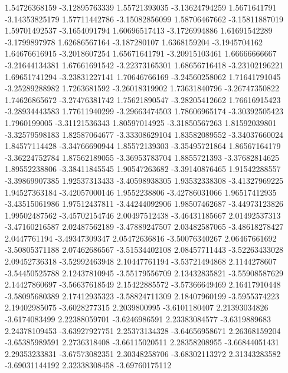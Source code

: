   1.54726368159   -3.12895763339
  1.55721393035   -3.13624794259
   1.5671641791   -3.14353825179
  1.57711442786   -3.15082856099
  1.58706467662   -3.15811887019
  1.59701492537    -3.1654091794
  1.60696517413    -3.1726994886
  1.61691542289    -3.1799897978
  1.62686567164     -3.187280107
   1.6368159204    -3.1945704162
  1.64676616915    -3.2018607254
  1.65671641791   -3.20915103461
  1.66666666667   -3.21644134381
  1.67661691542   -3.22373165301
  1.68656716418   -3.23102196221
  1.69651741294   -3.23831227141
  1.70646766169   -3.24560258062
  1.71641791045   -3.25289288982
   1.7263681592   -3.26018319902
  1.73631840796   -3.26747350822
  1.74626865672   -3.27476381742
  1.75621890547   -3.28205412662
  1.76616915423   -3.28934443583
  1.77611940299   -3.29663474503
  1.78606965174   -3.30392505423
   1.7960199005   -3.31121536343
  1.80597014925   -3.31850567263
  1.81592039801   -3.32579598183
  1.82587064677   -3.33308629104
  1.83582089552   -3.34037660024
  1.84577114428   -3.34766690944
  1.85572139303   -3.35495721864
  1.86567164179   -3.36224752784
  1.87562189055   -3.36953783704
   1.8855721393   -3.37682814625
  1.89552238806   -3.38411845545
  1.90547263682   -3.39140876465
  1.91542288557   -3.39869907385
  1.92537313433   -3.40598938305
  1.93532338308   -3.41327969225
  1.94527363184   -3.42057000146
   1.9552238806   -3.42786031066
  1.96517412935   -3.43515061986
  1.97512437811   -3.44244092906
  1.98507462687   -3.44973123826
  1.99502487562   -3.45702154746
  2.00497512438   -3.46431185667
  2.01492537313   -3.47160216587
  2.02487562189   -3.47889247507
  2.03482587065   -3.48618278427
   2.0447761194   -3.49347309347
  2.05472636816   -3.50076340267
  2.06467661692   -3.50805371188
  2.07462686567   -3.51534402108
  2.08457711443   -3.52263433028
  2.09452736318   -3.52992463948
  2.10447761194   -3.53721494868
   2.1144278607   -3.54450525788
  2.12437810945   -3.55179556709
  2.13432835821   -3.55908587629
  2.14427860697   -3.56637618549
  2.15422885572   -3.57366649469
  2.16417910448   -3.58095680389
  2.17412935323   -3.58824711309
  2.18407960199    -3.5955374223
  2.19402985075    -3.6028277315
   2.2039800995    -3.6101180407
  2.21393034826    -3.6174083499
  2.22388059701    -3.6246986591
  2.23383084577    -3.6319889683
  2.24378109453   -3.63927927751
  2.25373134328   -3.64656958671
  2.26368159204   -3.65385989591
   2.2736318408   -3.66115020511
  2.28358208955   -3.66844051431
  2.29353233831   -3.67573082351
  2.30348258706   -3.68302113272
  2.31343283582   -3.69031144192
  2.32338308458   -3.69760175112
